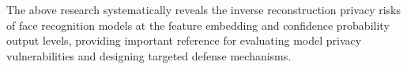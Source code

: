 \begin{eabstract}
The above research systematically reveals the inverse reconstruction privacy risks of face recognition models at the feature embedding and confidence probability output levels, providing important reference for evaluating model privacy vulnerabilities and designing targeted defense mechanisms.
\end{eabstract}
